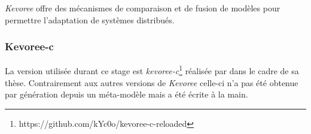 \emph{Kevoree} offre des mécanismes de comparaison et de fusion de modèles pour permettre l'adaptation de systèmes distribués.

\subsubsection{Kevoree-c}

La version utilisée durant ce stage est \emph{kevoree-c}\footnote{https://github.com/kYc0o/kevoree-c-reloaded} réalisée par \paco dans le cadre de sa thèse. Contrairement aux autres versions de \emph{Kevoree} celle-ci n'a pas été obtenue par génération depuis un méta-modèle mais a été écrite à la main.


